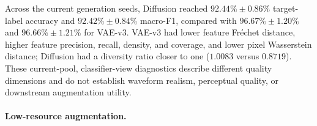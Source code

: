 \documentclass{article}
\begin{document}
\begin{table}[t]
  \caption{Generator-quality diagnostics for the current three-seed generated pools.}
  \label{tab:quality}
  \centering
  \small
\end{table}

Across the current generation seeds, Diffusion reached
$92.44\%\pm0.86\%$ target-label accuracy and
$92.42\%\pm0.84\%$ macro-F1, compared with $96.67\%\pm1.20\%$ and
$96.66\%\pm1.21\%$ for VAE-v3. VAE-v3 had lower feature Fr\'echet distance, higher feature
precision, recall, density, and coverage, and lower pixel Wasserstein distance;
Diffusion had a diversity ratio closer to one ($1.0083$ versus $0.8719$). These current-pool,
classifier-view diagnostics describe different quality dimensions and do not
establish waveform realism, perceptual quality, or downstream augmentation
utility.

\paragraph{Low-resource augmentation.}
\begin{table}[t]
  \caption{Validation selection and held-out test results for low-resource CRNN augmentation.}
  \label{tab:low-resource}
  \centering
  \small
\end{table}
\end{document}
